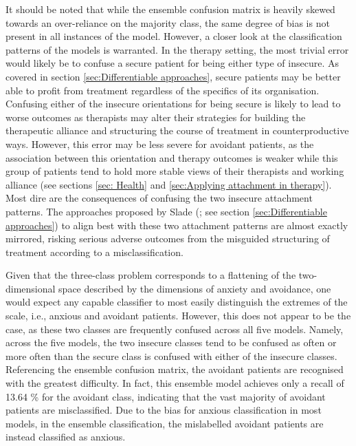 \documentclass[12pt]{report}
\begin{document}
It should be noted that while the ensemble confusion matrix is heavily skewed towards an over-reliance on the majority class, the same degree of bias is not present in all instances of the model.
However, a closer look at the classification patterns of the models is warranted.
In the therapy setting, the most trivial error would likely be to confuse a secure patient for being either type of insecure.
As covered in section \ref{sec:Differentiable approaches}, secure patients may be better able to profit from treatment regardless of the specifics of its organisation.
Confusing either of the insecure orientations for being secure is likely to lead to worse outcomes as therapists may alter their strategies for building the therapeutic alliance and structuring the course of treatment in counterproductive ways.
However, this error may be less severe for avoidant patients, as the association between this orientation and therapy outcomes is weaker while this group of patients tend to hold more stable views of their therapists and working alliance (see sections \ref{sec: Health} and \ref{sec:Applying attachment in therapy}).
Most dire are the consequences of confusing the two insecure attachment patterns.
The approaches proposed by Slade (; see section \ref{sec:Differentiable approaches}) to align best with these two attachment patterns are almost exactly mirrored, risking serious adverse outcomes from the misguided structuring of treatment according to a misclassification.

Given that the three-class problem corresponds to a flattening of the two-dimensional space described by the dimensions of anxiety and avoidance, one would expect any capable classifier to most easily distinguish the extremes of the scale, i.e., anxious and avoidant patients.
However, this does not appear to be the case, as these two classes are frequently confused across all five models.
Namely, across the five models, the two insecure classes tend to be confused as often or more often than the secure class is confused with either of the insecure classes.
Referencing the ensemble confusion matrix, the avoidant patients are recognised with the greatest difficulty.
In fact, this ensemble model achieves only a recall of 13.64 \% for the avoidant class, indicating that the vast majority of avoidant patients are misclassified.
Due to the bias for anxious classification in most models, in the ensemble classification, the mislabelled avoidant patients are instead classified as anxious.
\end{document}
